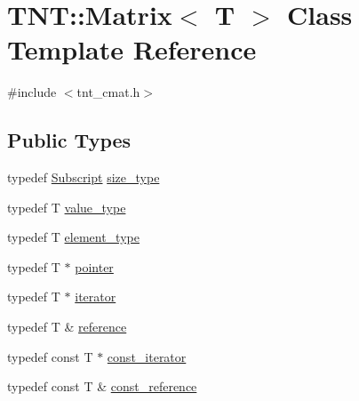 \hypertarget{classTNT_1_1Matrix}{\section{T\-N\-T\-:\-:Matrix$<$ T $>$ Class Template Reference}
\label{classTNT_1_1Matrix}
}


{\ttfamily \#include $<$tnt\-\_\-cmat.\-h$>$}

\subsection*{Public Types}
\begin{DoxyCompactItemize}
\item 
typedef \hyperlink{namespaceTNT_af22e3f1460e145c04ce4e7d701e4c1c1}{Subscript} \hyperlink{classTNT_1_1Matrix_a42f57fd19de0ba2edce3734f41431727}{size\-\_\-type}
\item 
typedef T \hyperlink{classTNT_1_1Matrix_a869b1a3e56a38bdaeb0b4f698b08e3c5}{value\-\_\-type}
\item 
typedef T \hyperlink{classTNT_1_1Matrix_a8ecf0a648bbfaf636fd78c21b35a0a4d}{element\-\_\-type}
\item 
typedef T $\ast$ \hyperlink{classTNT_1_1Matrix_aa7db7adc5513f7d8bf067965b97d7c42}{pointer}
\item 
typedef T $\ast$ \hyperlink{classTNT_1_1Matrix_a8233a1d03d4cfeab1d7cfec560cd2f0c}{iterator}
\item 
typedef T \& \hyperlink{classTNT_1_1Matrix_a129951783800dd85d3dcc1f6dd2062f9}{reference}
\item 
typedef const T $\ast$ \hyperlink{classTNT_1_1Matrix_a39334142ce0b5ee917e7b222a6b5637b}{const\-\_\-iterator}
\item 
typedef const T \& \hyperlink{classTNT_1_1Matrix_a6d3ceefbf1675aad4acadac4f78ed04b}{const\-\_\-reference}
\end{DoxyCompactItemize}
